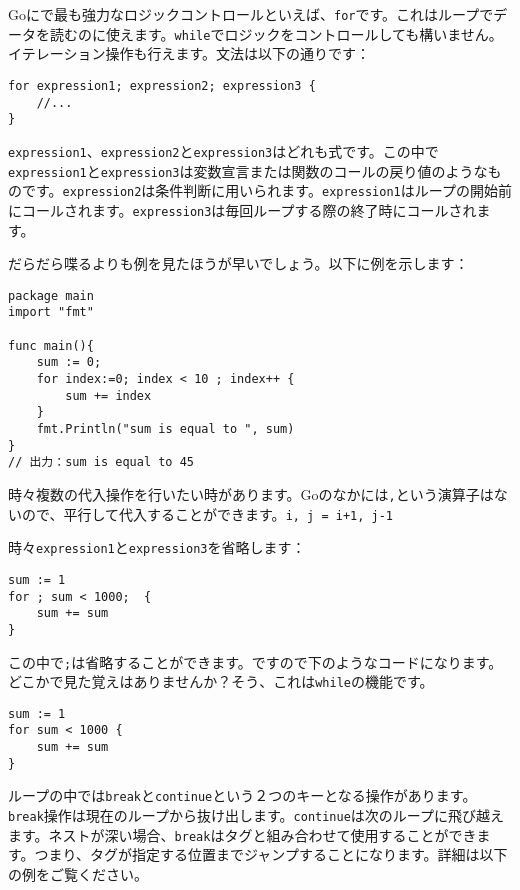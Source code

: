 Goにで最も強力なロジックコントロールといえば、\texttt{for}です。これはループでデータを読むのに使えます。\texttt{while}でロジックをコントロールしても構いません。イテレーション操作も行えます。文法は以下の通りです：

\begin{lstlisting}[numbers=none]
for expression1; expression2; expression3 {
    //...
}
\end{lstlisting}

\texttt{expression1}、\texttt{expression2}と\texttt{expression3}はどれも式です。この中で\texttt{expression1}と\texttt{expression3}は変数宣言または関数のコールの戻り値のようなものです。\texttt{expression2}は条件判断に用いられます。\texttt{expression1}はループの開始前にコールされます。\texttt{expression3}は毎回ループする際の終了時にコールされます。

だらだら喋るよりも例を見たほうが早いでしょう。以下に例を示します：


\begin{lstlisting}[numbers=none]
package main
import "fmt"

func main(){
    sum := 0;
    for index:=0; index < 10 ; index++ {
        sum += index
    }
    fmt.Println("sum is equal to ", sum)
}
// 出力：sum is equal to 45
\end{lstlisting}

時々複数の代入操作を行いたい時があります。Goのなかには\texttt{,}という演算子はないので、平行して代入することができます。\texttt{i, j = i+1, j-1}

時々\texttt{expression1}と\texttt{expression3}を省略します：


\begin{lstlisting}[numbers=none]
sum := 1
for ; sum < 1000;  {
    sum += sum
}
\end{lstlisting}

この中で\texttt{;}は省略することができます。ですので下のようなコードになります。どこかで見た覚えはありませんか？そう、これは\texttt{while}の機能です。

\begin{lstlisting}[numbers=none]
sum := 1
for sum < 1000 {
    sum += sum
}
\end{lstlisting}

ループの中では\texttt{break}と\texttt{continue}という２つのキーとなる操作があります。\texttt{break}操作は現在のループから抜け出します。\texttt{continue}は次のループに飛び越えます。ネストが深い場合、\texttt{break}はタグと組み合わせて使用することができます。つまり、タグが指定する位置までジャンプすることになります。詳細は以下の例をご覧ください。

